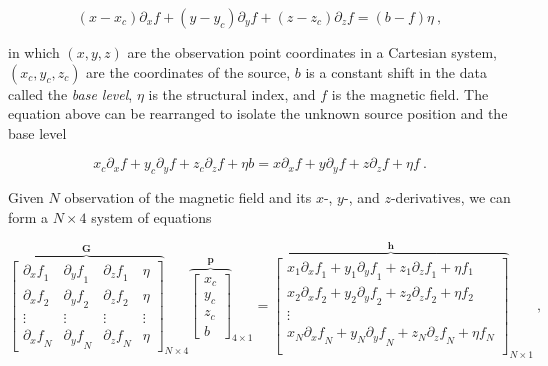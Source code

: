         \begin{equation}
        \label{eq_euler_homogeneity}
        (x - x_c)\partial_x f
        + (y - y_c)\partial_y f
        + (z - z_c)\partial_z f
        = (b - f)\eta
        \ ,
        \end{equation}

    \noindent
    in which $(x, y, z)$ are the observation point coordinates in a Cartesian system, $(x_c, y_c, z_c)$ are the coordinates of the source, $b$ is a constant shift in the data called the \textit{base level}, $\eta$ is the structural index, and $f$ is the magnetic field.
    The equation above can be rearranged to isolate the unknown source position  and the base level

    \begin{equation}
    x_c \partial_x f + y_c \partial_y f + z_c \partial_z f + \eta b
    =
    x \partial_x f + y \partial_y f + z \partial_z f + \eta f
    \ .
    \end{equation}

    Given $N$ observation of the magnetic field and its $x$-, $y$-, and $z$-derivatives, we can form a $N \times 4$ system of equations

    \begin{equation}
    {\overbrace{
    \begin{bmatrix}
      {\partial_x f}_1 & {\partial_y f}_1 & {\partial_z f}_1 & \eta \\
      {\partial_x f}_2 & {\partial_y f}_2 & {\partial_z f}_2 & \eta \\
      \vdots & \vdots & \vdots & \vdots \\
      {\partial_x f}_N & {\partial_y f}_N & {\partial_z f}_N & \eta
    \end{bmatrix}
    }^{\mathbf{G}}}_{N \times 4}
    {\overbrace{
    \begin{bmatrix}
      x_c \\ y_c \\ z_c \\ b
    \end{bmatrix}
    }^{\mathbf{p}}}_{4 \times 1}
    =
    {\overbrace{
    \begin{bmatrix}
      x_1 {\partial_x f}_1 + y_1 {\partial_y f}_1 + z_1 {\partial_z f}_1 + \eta f_1 \\
      x_2 {\partial_x f}_2 + y_2 {\partial_y f}_2 + z_2 {\partial_z f}_2 + \eta f_2 \\
      \vdots \\
      x_N {\partial_x f}_N + y_N {\partial_y f}_N + z_N {\partial_z f}_N + \eta f_N \\
    \end{bmatrix}
    }^{\mathbf{h}}}_{N \times 1}
    \ ,
    \end{equation}

